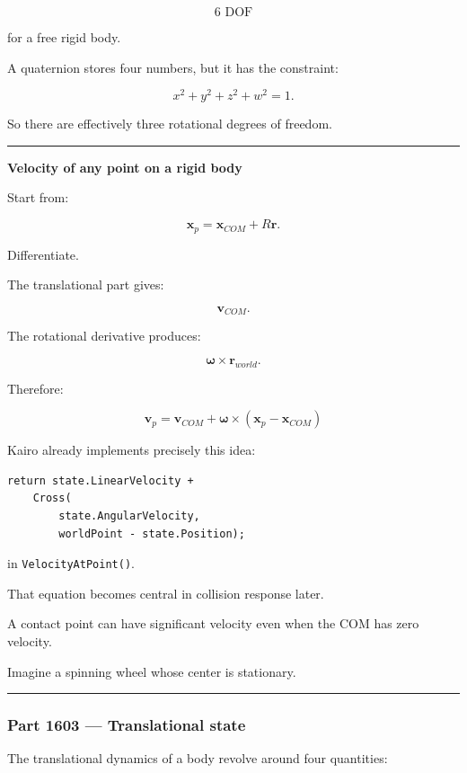 \[
\boxed{6\text{ DOF}}
\]

for a free rigid body.

A quaternion stores four numbers, but it has the constraint:

\[
x^2+y^2+z^2+w^2=1.
\]

So there are effectively three rotational degrees of freedom.

\begin{center}\rule{0.5\linewidth}{0.5pt}\end{center}

\textbf{Velocity of any point on a rigid body}

Start from:

\[
\mathbf{x}_p
=
\mathbf{x}_{COM}
+
R\mathbf{r}.
\]

Differentiate.

The translational part gives:

\[
\mathbf{v}_{COM}.
\]

The rotational derivative produces:

\[
\boldsymbol{\omega}\times\mathbf{r}_{world}.
\]

Therefore:

\[
\boxed{
\mathbf{v}_p
=
\mathbf{v}_{COM}
+
\boldsymbol{\omega}
\times
(\mathbf{x}_p-\mathbf{x}_{COM})
}
\]

Kairo already implements precisely this idea:

\begin{verbatim}
return state.LinearVelocity +
    Cross(
        state.AngularVelocity,
        worldPoint - state.Position);
\end{verbatim}

in \texttt{VelocityAtPoint()}.

That equation becomes central in collision response later.

A contact point can have significant velocity even when the COM has zero velocity.

Imagine a spinning wheel whose center is stationary.

\begin{center}\rule{0.5\linewidth}{0.5pt}\end{center}

\subsubsection{Part 1603 --- Translational state}\label{part-1603-translational-state}

The translational dynamics of a body revolve around four quantities:

